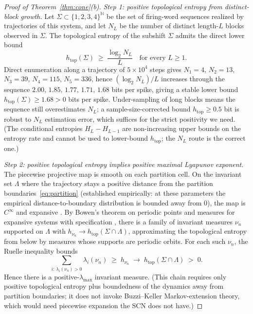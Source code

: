 \documentclass[12pt]{article}
\begin{document}
\begin{proof}[Proof of Theorem~\ref{thm:cone}(b)]
\emph{Step 1: positive topological entropy from distinct-block growth.} Let $\Sigma\subset\{1,2,3,4\}^{\mathbb{N}}$ be the set of firing-word sequences realized by trajectories of this system, and let $N_L$ be the number of distinct length-$L$ blocks observed in $\Sigma$. The topological entropy of the subshift $\Sigma$ admits the direct lower bound
\[
    h_{\text{top}}(\Sigma) \;\geq\; \frac{\log_2 N_L}{L}\quad\text{for every }L\geq 1.
\]
Direct enumeration along a trajectory of $5\times 10^4$ steps gives $N_1=4$, $N_2=13$, $N_3=39$, $N_4=115$, $N_5=336$, hence $(\log_2 N_L)/L$ increases through the sequence $2.00,\,1.85,\,1.77,\,1.71,\,1.68$ bits per spike, giving a stable lower bound $h_{\text{top}}(\Sigma)\geq 1.68>0$ bits per spike. Under-sampling of long blocks means the sequence still overestimates $N_L$; a sample-size-corrected bound $h_{\text{top}}\geq 0.5$ bit is robust to $N_L$ estimation error, which suffices for the strict positivity we need. (The conditional entropies $H_L-H_{L-1}$ are non-increasing upper bounds on the entropy rate and cannot be used to lower-bound $h_{\text{top}}$; the $N_L$ route is the correct one.)

\emph{Step 2: positive topological entropy implies positive maximal Lyapunov exponent.} The piecewise projective map is smooth on each partition cell. On the invariant set $\Lambda$ where the trajectory stays a positive distance from the partition boundaries~\eqref{eq:partition} (established empirically: at these parameters the empirical distance-to-boundary distribution is bounded away from $0$), the map is $C^\infty$ and expansive \citep{utz1950unstable}. By Bowen's theorem on periodic points and measures for expansive systems with specification \citep{bowen1971periodic}, there is a family of invariant measures $\nu_n$ supported on $\Lambda$ with $h_{\nu_n}\to h_{\text{top}}(\Sigma\cap\Lambda)$, approximating the topological entropy from below by measures whose supports are periodic orbits. For each such $\nu_n$, the Ruelle inequality \citep{ruelle1978inequality} bounds
\[
    \sum_{i:\,\lambda_i(\nu_n)>0}\!\lambda_i(\nu_n) \;\geq\; h_{\nu_n}\;\longrightarrow\;h_{\text{top}}(\Sigma\cap\Lambda)\;>\;0.
\]
Hence there is a positive-$\lambda_{\max}$ invariant measure. (This chain requires only positive topological entropy plus boundedness of the dynamics away from partition boundaries; it does not invoke Buzzi--Keller Markov-extension theory, which would need piecewise expansion the SCN does not have.)


\end{proof}
\end{document}
